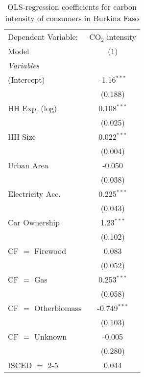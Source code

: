 
\begin{table}[htbp!]
   \centering
   \small
   \begin{adjustbox}{width = 1\textwidth, max height = 0.95\textheight, center}
      \begin{threeparttable}[b]
         \caption{\label{tab:OLS_1_BFA} OLS-regression coefficients for carbon intensity of consumers in Burkina Faso}
         \begin{tabular}{lc}
            \tabularnewline \midrule \midrule
            Dependent Variable: & CO$_{2}$ intensity\\  
            Model               & (1)\\  
            \midrule
            \emph{Variables}\\
            (Intercept)         & -1.16$^{***}$\\   
                                & (0.188)\\   
            HH Exp. (log)       & 0.108$^{***}$\\   
                                & (0.025)\\   
            HH Size             & 0.022$^{***}$\\   
                                & (0.004)\\   
            Urban Area          & -0.050\\   
                                & (0.038)\\   
            Electricity Acc.    & 0.225$^{***}$\\   
                                & (0.043)\\   
            Car Ownership       & 1.23$^{***}$\\   
                                & (0.102)\\   
            CF $=$ Firewood     & 0.083\\   
                                & (0.052)\\   
            CF $=$ Gas          & 0.253$^{***}$\\   
                                & (0.058)\\   
            CF $=$ Otherbiomass & -0.749$^{***}$\\   
                                & (0.103)\\   
            CF $=$ Unknown      & -0.005\\   
                                & (0.280)\\   
            ISCED $=$ 2-5       & 0.044\\   

\end{tabular}
\end{threeparttable}
\end{adjustbox}
\end{table}

